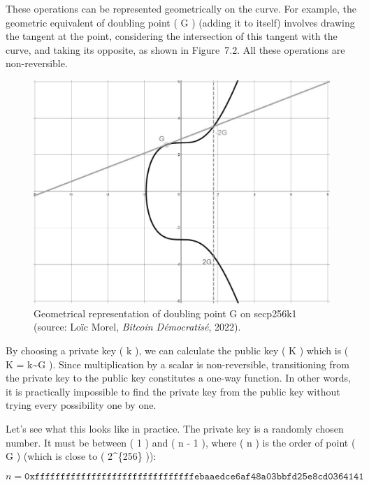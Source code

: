 \documentclass[
  a5paper,
  smalldemyvopaper,10pt,twoside,onecolumn,openright,extrafontsizes,hidelinks]{memoir}
\begin{document}
These operations can be represented geometrically on the curve. For
example, the geometric equivalent of doubling point ( G ) (adding it to
itself) involves drawing the tangent at the point, considering the
intersection of this tangent with the curve, and taking its opposite, as
shown in Figure~7.2. All these operations are non-reversible.

\begin{figure}

{\centering \includegraphics{chapters/img/secp256k1-multiplication.png}

}

\caption{Geometrical representation of doubling point G on secp256k1
(source: Loïc Morel, \emph{Bitcoin Démocratisé}, 2022).}

\end{figure}%

By choosing a private key ( k ), we can calculate the public key ( K )
which is ( K = k\textasciitilde G ). Since multiplication by a scalar is
non-reversible, transitioning from the private key to the public key
constitutes a one-way function. In other words, it is practically
impossible to find the private key from the public key without trying
every possibility one by one.

Let's see what this looks like in practice. The private key is a
randomly chosen number. It must be between ( 1 ) and ( n - 1 ), where (
n ) is the order of point ( G ) (which is close to ( 2\^{}\{256\} )):

\[n = \mathtt{0xfffffffffffffffffffffffffffffffebaaedce6af48a03bbfd25e8cd0364141}\]
\end{document}
